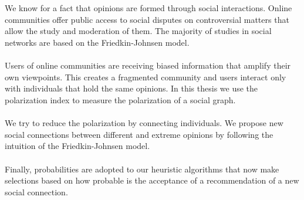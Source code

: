 \chapter*{\abstractname}
\addstarredchapter{\abstractname} %

\noindent We know for a fact that opinions are formed through social interactions. Online communities offer public access to social disputes on controversial matters that allow the study and moderation of them. The majority of studies in social networks are based on the Friedkin-Johnsen model.
\\
\\
Users of online communities are receiving biased information that amplify their own viewpoints. This creates a fragmented community and users interact only with individuals that hold the same opinions. In this thesis we use the polarization index to measure the polarization of a social graph.
\\
\\We try to reduce the polarization by connecting individuals. We propose new social connections between different and extreme opinions by following the intuition of the Friedkin-Johnsen model. 
\\
\\
Finally, probabilities are adopted to our heuristic algorithms that now make selections based on how probable is the acceptance of a recommendation of a new social connection. 

\bigskip
